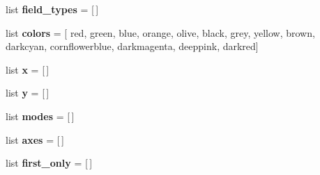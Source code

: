 \begin{DoxyCompactItemize}
\mbox{\label{namespacepymavlink_1_1tools_1_1mavgraph_a7dd677bc790050d4a38d0a78a814fb78}} 
list {\bfseries field\+\_\+types} = \mbox{[}$\,$\mbox{]}
\item 
\mbox{\label{namespacepymavlink_1_1tools_1_1mavgraph_a19862d005460bc9f0c104743009a0ff1}} 
list {\bfseries colors} = \mbox{[} \textquotesingle{}red\textquotesingle{}, \textquotesingle{}green\textquotesingle{}, \textquotesingle{}blue\textquotesingle{}, \textquotesingle{}orange\textquotesingle{}, \textquotesingle{}olive\textquotesingle{}, \textquotesingle{}black\textquotesingle{}, \textquotesingle{}grey\textquotesingle{}, \textquotesingle{}yellow\textquotesingle{}, \textquotesingle{}brown\textquotesingle{}, \textquotesingle{}darkcyan\textquotesingle{}, \textquotesingle{}cornflowerblue\textquotesingle{}, \textquotesingle{}darkmagenta\textquotesingle{}, \textquotesingle{}deeppink\textquotesingle{}, \textquotesingle{}darkred\textquotesingle{}\mbox{]}
\item 
\mbox{\label{namespacepymavlink_1_1tools_1_1mavgraph_a850833f299bc2444a4e9077175f357cb}} 
list {\bfseries x} = \mbox{[}$\,$\mbox{]}
\item 
\mbox{\label{namespacepymavlink_1_1tools_1_1mavgraph_a2083829da277f3d120e2db2239c5ede9}} 
list {\bfseries y} = \mbox{[}$\,$\mbox{]}
\item 
\mbox{\label{namespacepymavlink_1_1tools_1_1mavgraph_afec08af164f9c16e5f149392403e054b}} 
list {\bfseries modes} = \mbox{[}$\,$\mbox{]}
\item 
\mbox{\label{namespacepymavlink_1_1tools_1_1mavgraph_afd432b1bca4905c45ba006069d4a334b}} 
list {\bfseries axes} = \mbox{[}$\,$\mbox{]}
\item 
\mbox{\label{namespacepymavlink_1_1tools_1_1mavgraph_a431ebd83a706e02b7c11188800ec5455}} 
list {\bfseries first\+\_\+only} = \mbox{[}$\,$\mbox{]}
\item 
\mbox{\label{namespacepymavlink_1_1tools_1_1mavgraph_a3635bc37df2af78d82ed236ef6f8b265}} 

\end{DoxyCompactItemize}
